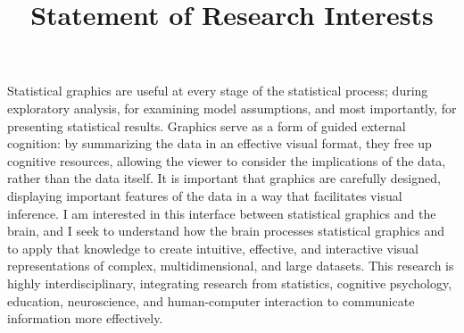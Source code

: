 \documentclass[11pt,letterpaper,sans,unicode]{moderncv}        %
\title{Statement of Research Interests}                               %
\begin{document}
\makecvtitle
\setlength{\parindent}{15pt} %

Statistical graphics are useful at every stage of the statistical process; during exploratory analysis, for examining model assumptions, and most importantly, for presenting statistical results. Graphics serve as a form of guided external cognition: by summarizing the data in an effective visual format, they free up cognitive resources, allowing the viewer to consider the implications of the data, rather than the data itself. It is important that graphics are carefully designed, displaying important features of the data in a way that facilitates visual inference. I am interested in this interface between statistical graphics and the brain, and I seek to understand how the brain processes statistical graphics and to apply that knowledge to create intuitive, effective, and interactive visual representations of complex, multidimensional, and large datasets. This research is highly interdisciplinary, integrating research from statistics, cognitive psychology, education, neuroscience, and human-computer interaction to communicate information more effectively. 
\end{document}

